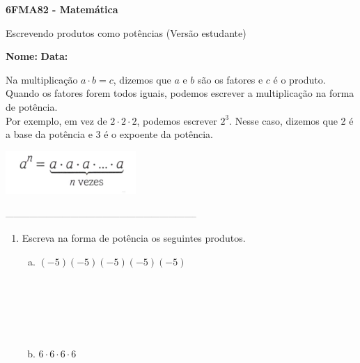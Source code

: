\documentclass[a4paper,14pt]{article}
\begin{document}
	
	\noindent\textbf{6FMA82 - Matemática} 
	
	\begin{center}Escrevendo produtos como potências (Versão estudante)
	\end{center}
	
	\noindent\textbf{Nome:} \underline{\hspace{10cm}}
	\noindent\textbf{Data:} \underline{\hspace{4cm}}
	
	
	\begin{multicols}{2}
		\noindent Na multiplicação $a \cdot b = c$, dizemos que $a$ e $b$ são os fatores e $c$ é o produto. \\
		Quando os fatores forem todos iguais, podemos escrever a multiplicação na forma de potência. \\
		Por exemplo, em vez de $2 \cdot 2 \cdot 2$, podemos escrever $2^3$. Nesse caso, dizemos que 2 é a base da potência e 3 é o expoente da potência.
		\begin{center}
			\includegraphics[width=0.7\linewidth]{6FMA82_imagens/imagem1}
		\end{center}
		\noindent\textsubscript{-----------------------------------------------------------------------}
		\begin{enumerate}
			\item Escreva na forma de potência os seguintes produtos.
			\begin{enumerate}[a)]
				\item $(-5)(-5)(-5)(-5)(-5)$ \\\\\\\\\\\\
				\item $6 \cdot 6 \cdot 6 \cdot 6$ \\\\\\\\\\\\

\end{enumerate}
\end{enumerate}
\end{multicols}
\end{document}
